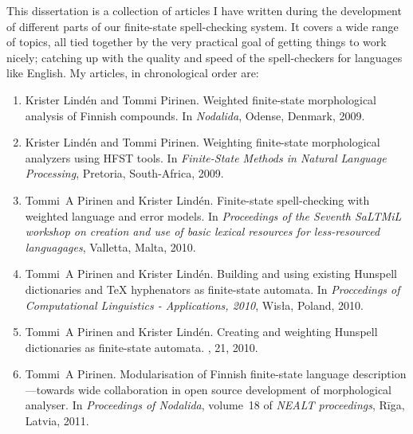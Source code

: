 \documentclass[officiallayout]{unihelcompling}
\begin{document}
This dissertation is a collection of articles I have written during the
development of different parts of our finite-state spell-checking system. It
covers a wide range of topics, all tied together by the very practical goal of
getting things to work nicely; catching up with the quality and speed of the
spell-checkers for languages like English. My articles, in chronological order
are:

\begin{enumerate}
    \item[\citetalias{pirinen2009weighted}]
        Krister Lindén and Tommi Pirinen.
        \newblock Weighted finite-state morphological analysis of Finnish 
        compounds.
        \newblock In \emph{Nodalida}, Odense, Denmark, 2009.
    \item[\citetalias{pirinen2009weighting}]
        Krister Lindén and Tommi Pirinen.
        \newblock Weighting finite-state morphological analyzers using HFST
        tools.
        \newblock In \emph{Finite-State Methods in Natural Language Processing},
        Pretoria, South-Africa, 2009.
    \item[\citetalias{pirinen2010finitestate}]
        Tommi~A Pirinen and Krister Lindén.
        \newblock Finite-state spell-checking with weighted language and error
        models.
        \newblock In {\em Proceedings of the Seventh SaLTMiL workshop on 
            creation and use of basic lexical resources for less-resourced 
        languagages}, Valletta, Malta, 2010.
    \item[\citetalias{pirinen2010building}]
        Tommi~A Pirinen and Krister Lindén.
        \newblock Building and using existing Hunspell dictionaries and {\TeX }
        hyphenators as finite-state automata.
        \newblock In {\em Proccedings of Computational Linguistics -
            Applications, 2010}, Wis{\l}a, Poland, 2010.
    \item[\citetalias{pirinen2010creating}]
        Tommi~A Pirinen and Krister Lindén.
        \newblock Creating and weighting Hunspell dictionaries as finite-state
        automata.
        , 21, 2010.
    \item[\citetalias{pirinen2011modularisation}]
        Tommi~A Pirinen.
        \newblock Modularisation of Finnish finite-state language 
        description—towards wide collaboration in open source development of
        morphological analyser.
        \newblock In {\em Proceedings of Nodalida}, volume~18 of {\em NEALT
        proceedings}, Rīga, Latvia, 2011.

\end{enumerate}
\end{document}
